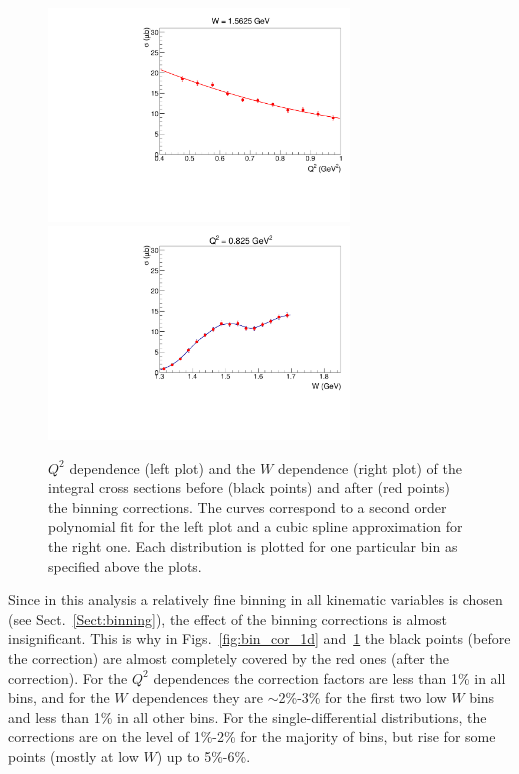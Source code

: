 \begin{figure}[htp]
\begin{center}
\includegraphics[width=8cm]{pictures/corrections/bin_cor_q2.pdf}
\includegraphics[width=8cm]{pictures/corrections/bin_cor_w.pdf}
\caption{\small $Q^{2}$ dependence (left plot) and the $W$ dependence (right plot) of the integral cross sections before (black points) and after (red points) the binning corrections. The curves correspond to a second order polynomial fit for the left plot and a cubic spline approximation for the right one. Each distribution is plotted for one particular bin as specified above the plots.} \label{fig:bincor_w_q2}
\end{center}
\end{figure}
 
Since in this analysis a relatively fine binning in all kinematic variables is chosen (see Sect.~\ref{Sect:binning}), the effect of the binning corrections is almost insignificant. 
This is why in Figs.~\ref{fig:bin_cor_1d} and~\ref{fig:bincor_w_q2} the black points (before the correction) are almost completely covered by the red ones (after the correction). For the $Q^{2}$ dependences the correction factors are less than 1\% in all bins, and for the $W$ dependences they are $\sim$2\%-3\% for the first two low $W$ bins and less than 1\% in all other bins. For the single-differential distributions, the corrections are on the level of 1\%-2\% for the majority of bins, but rise for some points (mostly at low $W$) up to 5\%-6\%.

